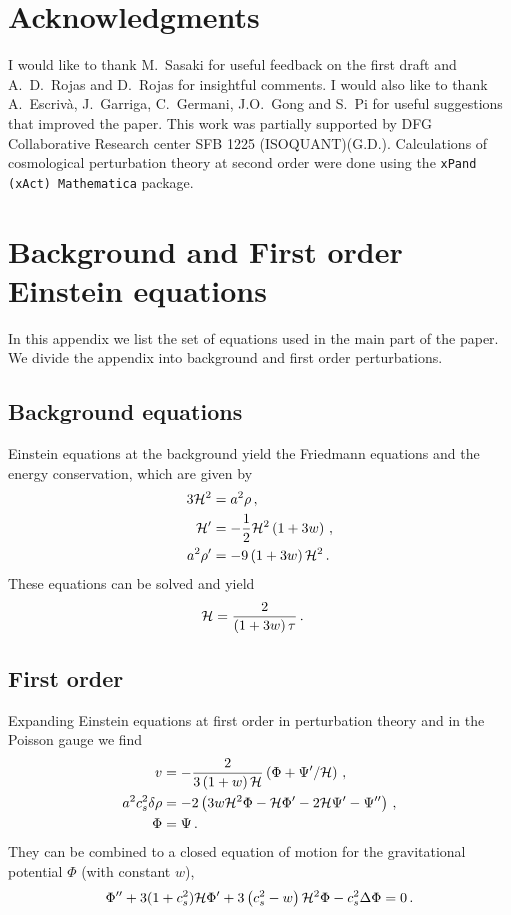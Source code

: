 \documentclass[aps,10pt,prd,groupedaddress,nofootinbib,notitlepage,eqsecnum,preprintnumbers]{revtex4-1}
\begin{document}
\section*{Acknowledgments}

I would like to thank M.~Sasaki for useful feedback on the first draft and A.~D.~Rojas and D.~Rojas for insightful comments. I would also like to thank A.~Escriv\`{a}, J.~Garriga, C.~Germani, J.O.~Gong and S.~Pi for useful suggestions that improved the paper. This work was partially supported by DFG Collaborative Research center SFB 1225 (ISOQUANT)(G.D.). Calculations of cosmological perturbation theory at second order were done using the \texttt{xPand (xAct) Mathematica} package.

\appendix 

\section{Background and First order Einstein equations \label{App:first order}}
In this appendix we list the set of equations used in the main part of the paper. We divide the appendix into background and first order perturbations.

\subsection{Background equations}
Einstein equations at the background yield the Friedmann equations and the energy conservation, which are given by
\begin{align}
3{\cal H}^2&=a^2\rho\,,\\
{\cal H}'&=-\frac{1}{2}{\cal H}^2\left(1+3w\right)\,,\\
a^2\rho'&=-9\left(1+3w\right){\cal H}^2\,.
\end{align}
These equations can be solved and yield
\begin{align}
{\cal H}&=\frac{2}{\left(1+3w\right)\tau}\,.
\end{align}


\subsection{First order}
Expanding Einstein equations at first order in perturbation theory and in the Poisson gauge we find
\begin{align}
v&=-\frac{2}{3\left(1+w\right){\cal H}}\left(\Phi+\Psi'/{\cal H}\right)\,,\\
a^2c_s^2\delta\rho&=-2\left(3w{\cal H}^2\Phi-{\cal H}\Phi'-2{\cal H}\Psi'-\Psi''\right)\,,\\
\Phi&=\Psi\,.
\end{align}
They can be combined to a closed equation of motion for the gravitational potential $\Phi$ (with constant $w$),
\begin{align}
\Phi''+3(1+c_s^2){\cal H}\Phi'+3\left(c_s^2-w\right){\cal H}^2\Phi-c_s^2\Delta\Phi=0\,.
\end{align}
\end{document}
